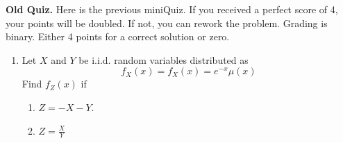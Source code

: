 \textbf{Old Quiz.} Here is the previous miniQuiz. If you received a perfect score of 4,
your points will be doubled. If not, you can rework the problem.
Grading is binary. Either 4 points for a correct solution or zero.

\begin{enumerate}
\item
  Let $X$ and $Y$ be i.i.d. random variables distributed as
  $$ f_X(x) = f_X(x) = e^{-x} \mu (x)$$
  Find $f_Z (x)$ if
  \begin{enumerate}
  \item $Z=-X-Y$.
  \item $Z=\frac{X}{Y}$
  \end{enumerate}
\end{enumerate}

